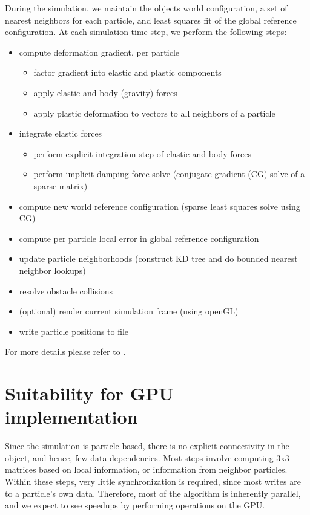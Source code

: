 \documentclass[cameraready]{acmsiggraph-awb}
\begin{document}
During the simulation, we maintain the objects world configuration, a set of nearest neighbors for each particle, and least squares fit of the global reference configuration.  At each simulation time step, we perform the following steps:
\newpage
\begin{itemize}

\item compute deformation gradient, per particle
\begin{itemize}
\item factor gradient into elastic and plastic components
\item apply elastic and body (gravity) forces
\item apply plastic deformation to vectors to all neighbors of a particle
\end{itemize}
\item integrate elastic forces
\begin{itemize}
\item perform explicit integration step of elastic and body forces
\item perform implicit damping force solve (conjugate gradient (CG) solve of a sparse matrix)
\end{itemize}
\item compute new world reference configuration (sparse least squares solve using CG)
\item compute per particle local error in global reference configuration 
\item update particle neighborhoods (construct KD tree and do bounded nearest neighbor lookups)
\item resolve obstacle collisions
\item (optional) render current simulation frame (using openGL)
\item write particle positions to file
\end{itemize}


For more details please refer to \cite{us}.

\section{Suitability for GPU implementation}

Since the simulation is particle based, there is no explicit connectivity in the object, and hence, few data dependencies.  
Most steps involve computing 3x3 matrices based on local information, or information from neighbor particles.  
Within these steps, very little synchronization is required, since most writes are to a particle's own data. 
Therefore, most of the algorithm is inherently parallel, and we expect to see speedups by performing operations on the GPU.  
\end{document}
